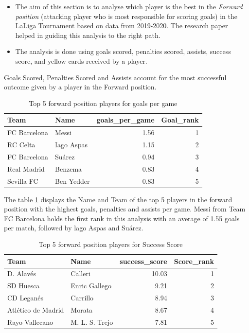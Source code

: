 \documentclass[11pt,a4paper,]{article}
\begin{document}
\begin{itemize}
\item
  The aim of this section is to analyse which player is the best in the \emph{Forward position} (attacking player who is most responsible for scoring goals) in the LaLiga Tournament based on data from 2019-2020. The research paper \textcite{majewski2016identification} helped in guiding this analysis to the right path.
\item
  The analysis is done using goals scored, penalties scored, assists, success score, and yellow cards received by a player.
\end{itemize}

Goals Scored, Penalties Scored and Assists account for the most successful outcome given by a player in the Forward position.

\begin{table}[H]

\caption{\label{tab:Goals-Analysis}Top 5 forward position players for goals per game}
\centering
\begin{tabular}[t]{l|l|r|r}
\hline
Team & Name & goals\_per\_game & Goal\_rank\\
\hline
FC Barcelona & Messi & 1.56 & 1\\
\hline
RC Celta & Iago Aspas & 1.15 & 2\\
\hline
FC Barcelona & Suárez & 0.94 & 3\\
\hline
Real Madrid & Benzema & 0.83 & 4\\
\hline
Sevilla FC & Ben Yedder & 0.83 & 5\\
\hline
\end{tabular}
\end{table}

The table \ref{tab:Goals-Analysis} displays the Name and Team of the top 5 players in the forward position with the highest goals, penalties and assists per game. Messi from Team FC Barcelona holds the first rank in this analysis with an average of 1.55 goals per match, followed by lago Aspas and Suárez.

\begin{table}[H]

\caption{\label{tab:Success-Scores}Top 5 forward position players for Success Score}
\centering
\begin{tabular}[t]{l|l|r|r}
\hline
Team & Name & success\_score & Score\_rank\\
\hline
D. Alavés & Calleri & 10.03 & 1\\
\hline
SD Huesca & Enric Gallego & 9.21 & 2\\
\hline
CD Leganés & Carrillo & 8.94 & 3\\
\hline
Atlético de Madrid & Morata & 8.67 & 4\\
\hline
Rayo Vallecano & M. L. S. Trejo & 7.81 & 5\\
\hline
\end{tabular}
\end{table}
\end{document}
